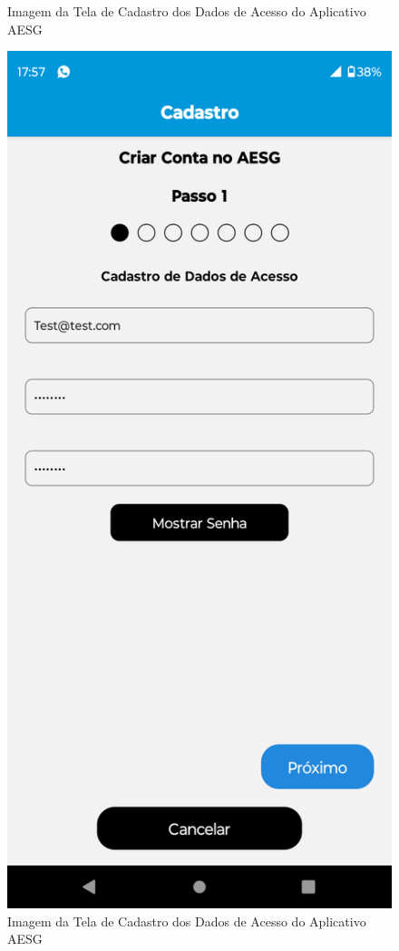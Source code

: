 \documentclass[
    12pt,                   %
    openright,              %
    oneside,                %
    a4paper,                %
    sumario=tradicional,    %
    english,                %
    brazil,                 %
    ]{abntex2}
\begin{document}
\begin{figure}[!h]
\begin{minipage}{0.5\textwidth}
                    \caption[Imagem da Tela de Cadastro dos Dados de Acesso do Aplicativo AESG]{ 
                    Imagem da Tela de Cadastro dos Dados de Acesso do Aplicativo AESG}
                    \label{fig:AppTelaCadastro10}
                \end{minipage}%
                \begin{minipage}{0.5\textwidth}
                    \centering
                    \includegraphics[width=0.8\linewidth]{Imagens/App Images User/AUCadastro1.png}
                    \caption[Imagem da Tela de Cadastro dos Dados de Acesso Preenchido do Aplicativo AESG]{ 
                    Imagem da Tela de Cadastro dos Dados de Acesso do Aplicativo AESG}
                    \label{fig:AppTelaCadastro1}
                \end{minipage}
            \end{figure}
\end{document}
